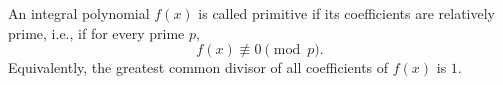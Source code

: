 An integral polynomial $f(x)$ is called primitive if its coefficients are relatively prime, i.e., if for every prime $p$,
$$f(x) \not\equiv 0 \pmod{p}.$$
Equivalently, the greatest common divisor of all coefficients of $f(x)$ is $1$.
